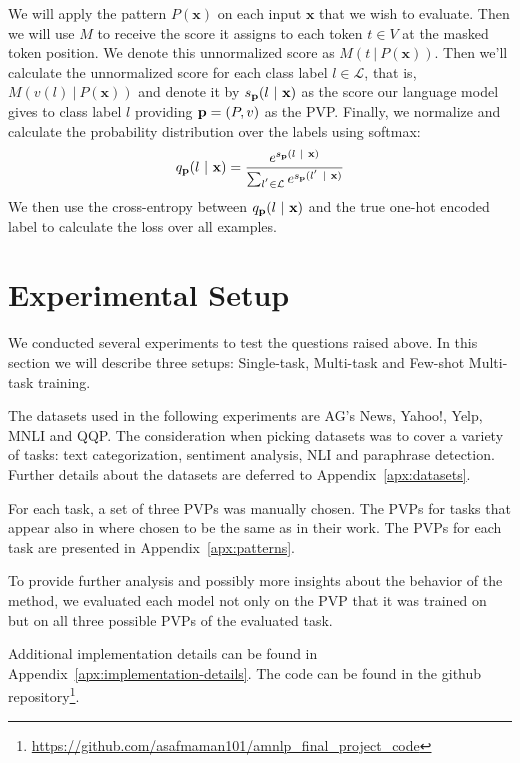 \documentclass[11pt,a4paper]{article}
\begin{document}
We will apply the pattern $P(\textbf{x})$ on each input $\textbf{x}$ that we wish to evaluate.
Then we will use $M$ to receive the score it assigns to each token $t\in{}V$ at the masked token position.
We denote this unnormalized score as $M(t\ |\ P(\textbf{x}))$.
Then we'll calculate the unnormalized score for each class label $l\in{}\mathcal{L}$, that is, $M(v(l)\ |\ P(\textbf{x}))$ and denote it by $s_{\text{\textbf{p}}}(l\ |\ \textbf{x})$ as the score our language model gives to class label $l$ providing $\text{\textbf{p}}=(P, v)$ as the PVP.
Finally, we normalize and calculate the probability distribution over the labels using softmax:
\[
	q_\text{\textbf{p}}(l\ |\ \textbf{x}) = \frac{e^{s_{\text{\textbf{p}}}(l\ |\ \textbf{x})}}{\sum_{l^{'}\in{}\mathcal{L}}e^{s_{\text{\textbf{p}}}(l^{'}\ |\ \textbf{x})}}
\]
We then use the cross-entropy between $q_\text{\textbf{p}}(l\ |\ \textbf{x})$ and the true one-hot encoded label to calculate the loss over all examples. 

\section{Experimental Setup}
\label{sec:experiments}



We conducted several experiments to test the questions raised above.
In this section we will describe three setups: Single-task, Multi-task and Few-shot Multi-task training.

The datasets used in the following experiments are AG's News, Yahoo!, Yelp, MNLI and QQP.
The consideration when picking datasets was to cover a variety of tasks: text categorization, sentiment analysis, NLI and paraphrase detection.
Further details about the datasets are deferred to Appendix~\ref{apx:datasets}.

For each task, a set of three PVPs was manually chosen.
The PVPs for tasks that appear also in \citet{schick2020exploiting} where chosen to be the same as in their work.
The PVPs for each task are presented in Appendix~\ref{apx:patterns}.

To provide further analysis and possibly more insights about the behavior of the method, we evaluated each model not only on the PVP that it was trained on but on all three possible PVPs of the evaluated task.

Additional implementation details can be found in Appendix~\ref{apx:implementation-details}.
The code can be found in the github repository\footnote{\url{https://github.com/asafmaman101/amnlp_final_project_code}}.
\end{document}

